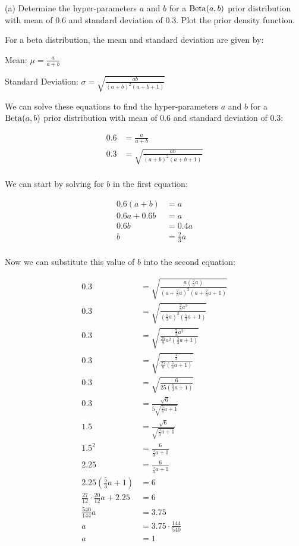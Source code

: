 \documentclass[12pt]{article}
\begin{document}
(a) Determine the hyper-parameters $a$ and $b$ for a ${\rm Beta} (a,b)$ prior distribution with mean of 0.6 and standard deviation of 0.3.  Plot the prior density function.

For a beta distribution, the mean and standard deviation are given by:

Mean: $\mu = \frac{a}{a + b}$

Standard Deviation: $\sigma = \sqrt{\frac{ab}{(a+b)^2(a+b+1)}}$

We can solve these equations to find the hyper-parameters $a$ and $b$ for a ${\rm Beta} (a,b)$ prior distribution with mean of 0.6 and standard deviation of 0.3:

\begin{align*}
0.6 &= \frac{a}{a + b} \\
0.3 &= \sqrt{\frac{ab}{(a+b)^2(a+b+1)}} \\
\end{align*}

We can start by solving for $b$ in the first equation:

\begin{align*}
0.6(a + b) &= a \\
0.6a + 0.6b &= a \\
0.6b &= 0.4a \\
b &= \frac{2}{3}a \\
\end{align*}

Now we can substitute this value of $b$ into the second equation:

\begin{align*}
0.3 &= \sqrt{\frac{a\left(\frac{2}{3}a\right)}{(a + \frac{2}{3}a)^2(a + \frac{2}{3}a + 1)}} \\
0.3 &= \sqrt{\frac{\frac{2}{3}a^2}{\left(\frac{5}{3}a\right)^2\left(\frac{5}{3}a + 1\right)}} \\
0.3 &= \sqrt{\frac{\frac{2}{3}a^2}{\frac{25}{9}a^2\left(\frac{5}{3}a + 1\right)}} \\
0.3 &= \sqrt{\frac{\frac{2}{3}}{\frac{25}{9}\left(\frac{5}{3}a + 1\right)}} \\
0.3 &= \sqrt{\frac{6}{25\left(\frac{5}{3}a + 1\right)}} \\
0.3 &= \frac{\sqrt{6}}{5\sqrt{\frac{5}{3}a + 1}} \\
1.5 &= \frac{\sqrt{6}}{\sqrt{\frac{5}{3}a + 1}} \\
1.5^2 &= \frac{6}{\frac{5}{3}a + 1} \\
2.25 &= \frac{6}{\frac{5}{3}a + 1} \\
2.25\left(\frac{5}{3}a + 1\right) &= 6 \\
\frac{27}{12} \cdot \frac{20}{12}a + 2.25 &= 6 \\
\frac{540}{144}a &= 3.75 \\
a &= 3.75 \cdot \frac{144}{540} \\
a &= 1 \\
\end{align*}
\end{document}
